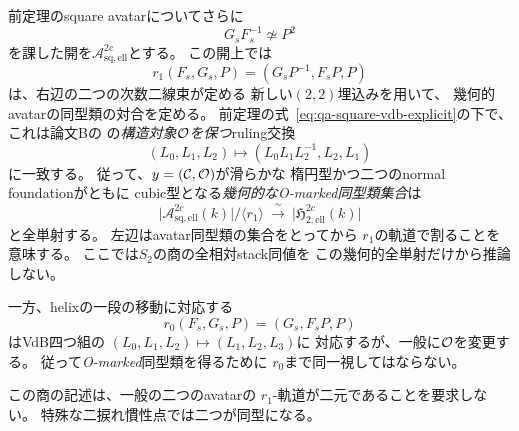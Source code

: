 \begin{theorem}[O-markingを保つruling反射と楕円型の商全単射]
\label{thm:qa-elliptic-avatar-pointed-quotient}
前定理のsquare avatarについてさらに
\[
 G_sF_s^{-1}\not\simeq P^2
 \tag{two-cub}\label{eq:qa-square-two-cubic-open}
\]
を課した開を$\mathcal A_{\mathrm{sq,ell}}^{2c}$とする。
この開上では
\[
 \boxed{\quad
 r_1(F_s,G_s,P)
  =(G_sP^{-1},F_sP,P)
 \quad}
 \tag{Sq-R}\label{eq:qa-square-pointed-reflection}
\]
は、右辺の二つの次数二線束が定める
新しい$(2,2)$埋込みを用いて、
幾何的avatarの同型類の対合を定める。
前定理の式~\eqref{eq:qa-square-vdb-explicit}の下で、
これは論文Bの
\cite[\texttt{lem:elliptic-two-reflections}]{QuadricModuli2026}
の\emph{構造対象$\mathcal O$を保つ}ruling交換
\[
 (L_0,L_1,L_2)\longmapsto
 (L_0L_1L_2^{-1},L_2,L_1)
\]
に一致する。
従って、$y=(\mathcal C,\mathcal O)$が滑らかな
楕円型かつ二つのnormal foundationがともに
cubic型となる\emph{幾何的なO-marked同型類集合}は
\[
 \boxed{\quad
 \bigl|\mathcal A_{\mathrm{sq,ell}}^{2c}(k)\bigr|
    /\langle r_1\rangle
 \ \xrightarrow{\ \sim\ }\
 \bigl|\mathfrak H_{2,\mathrm{ell}}^{2c}(k)\bigr|
 \quad}
 \tag{Sq-H2}\label{eq:qa-square-pointed-bijection}
\]
と全単射する。
左辺はavatar同型類の集合をとってから
$r_1$の軌道で割ることを意味する。
ここでは$S_2$の商の全相対stack同値を
この幾何的全単射だけから推論しない。

一方、helixの一段の移動に対応する
\[
 r_0(F_s,G_s,P)=(G_s,F_sP,P)
 \tag{Sq-T}\label{eq:qa-square-unpointed-shift}
\]
はVdB四つ組の
$(L_0,L_1,L_2)\mapsto(L_1,L_2,L_3)$に
対応するが、一般に$\mathcal O$を変更する。
従って\emph{O-marked}同型類を得るために
$r_0$まで同一視してはならない。

この商の記述は、一般の二つのavatarの
$r_1$-軌道が二元であることを要求しない。
特殊な二捩れ慣性点では二つが同型になる。
\end{theorem}
